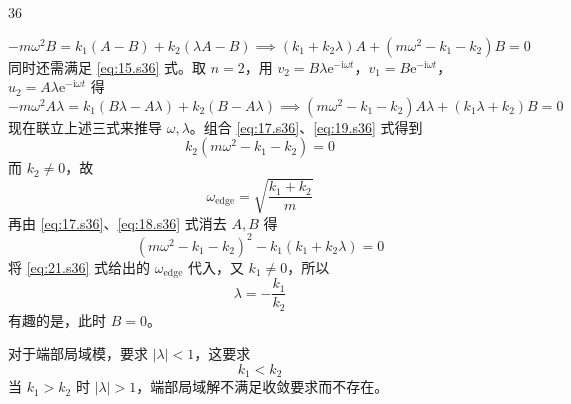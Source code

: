 \begin{solution}{36}
\begin{subsolution}
\begin{subsubsolution}
            \begin{equation}
                - m \omega^ {2} B = k _ {1} (A - B) + k _ {2} (\lambda A - B) \implies (k _ {1} + k _ {2} \lambda) A + (m \omega^ {2} - k _ {1} - k _ {2}) B = 0
                \label{eq:18.s36}
            \end{equation}
            同时还需满足 \eqref{eq:15.s36} 式。取 $n = 2$，用 $v_{2} = B\lambda \mathrm{e}^{-\mathrm{i}\omega t}$，$v_{1} = B\mathrm{e}^{-\mathrm{i}\omega t}$，$u_{2} = A\lambda \mathrm{e}^{-\mathrm{i}\omega t}$ 得
            \begin{equation}
                - m \omega^ {2} A \lambda = k _ {1} (B \lambda - A \lambda) + k _ {2} (B - A \lambda) \implies (m \omega^ {2} - k _ {1} - k _ {2}) A \lambda + (k _ {1} \lambda + k _ {2}) B = 0
                \label{eq:19.s36}
            \end{equation}
            现在联立上述三式来推导 $\omega, \lambda$。组合 \eqref{eq:17.s36}、\eqref{eq:19.s36} 式得到
            \begin{equation}
                k _ {2} (m \omega^ {2} - k _ {1} - k _ {2}) = 0
                \label{eq:20.s36}
            \end{equation}
            而 $k_{2} \neq 0$，故
            \begin{equation}
                \omega_ {\mathrm{edge}} = \sqrt {\frac {k _ {1} + k _ {2}}{m}}
                \label{eq:21.s36}
            \end{equation}
            再由 \eqref{eq:17.s36}、\eqref{eq:18.s36} 式消去 $A, B$ 得
            \begin{equation}
                (m \omega^ {2} - k _ {1} - k _ {2}) ^ {2} - k _ {1} (k _ {1} + k _ {2} \lambda) = 0
                \label{eq:22.s36}
            \end{equation}
            将 \eqref{eq:21.s36} 式给出的 $\omega_{\mathrm{edge}}$ 代入，又 $k_{1} \neq 0$，所以
            \begin{equation}
                \lambda = - \frac {k _ {1}}{k _ {2}}
                \label{eq:23.s36}
            \end{equation}
            有趣的是，此时 $B = 0$。

            对于端部局域模，要求 $|\lambda| < 1$，这要求
            \begin{equation}
                k _ {1} <   k _ {2}
                \label{eq:24.s36}
            \end{equation}
            当 $k_{1} > k_{2}$ 时 $|\lambda| > 1$，端部局域解不满足收敛要求而不存在。
        \end{subsubsolution}
    \end{subsolution}
\end{solution}